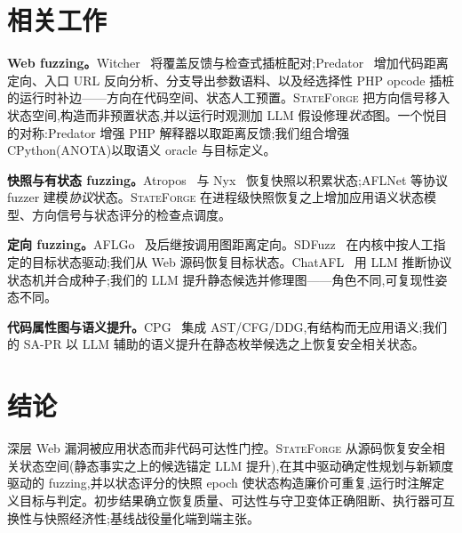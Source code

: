 \documentclass[letterpaper,twocolumn,10pt]{article}
\newcommand{\sys}{\textsc{StateForge}}
\begin{document}
\section{相关工作}
\label{sec:related}
\textbf{Web fuzzing。}Witcher~\cite{witcher} 将覆盖反馈与检查式插桩配对;Predator~\cite{predator} 增加代码距离定向、入口 URL 反向分析、分支导出参数语料、以及经选择性 PHP opcode 插桩的运行时补边——方向在代码空间、状态人工预置。\sys{} 把方向信号移入状态空间,构造而非预置状态,并以运行时观测加 LLM 假设修理\emph{状态}图。一个悦目的对称:Predator 增强 PHP 解释器以取距离反馈;我们组合增强 CPython(ANOTA)以取语义 oracle 与目标定义。

\textbf{快照与有状态 fuzzing。}Atropos~\cite{atropos} 与 Nyx~\cite{nyx} 恢复快照以积累状态;AFLNet 等协议 fuzzer 建模\emph{协议}状态。\sys{} 在进程级快照恢复之上增加应用语义状态模型、方向信号与状态评分的检查点调度。

\textbf{定向 fuzzing。}AFLGo~\cite{aflgo} 及后继按调用图距离定向。SDFuzz~\cite{sdfuzz} 在内核中按人工指定的目标状态驱动;我们从 Web 源码恢复目标状态。ChatAFL~\cite{chatafl} 用 LLM 推断协议状态机并合成种子;我们的 LLM 提升静态候选并修理图——角色不同,可复现性姿态不同。

\textbf{代码属性图与语义提升。}CPG~\cite{yamaguchi} 集成 AST/CFG/DDG,有结构而无应用语义;我们的 SA-PR 以 LLM 辅助的语义提升在静态枚举候选之上恢复安全相关状态。

\section{结论}
深层 Web 漏洞被应用状态而非代码可达性门控。\sys{} 从源码恢复安全相关状态空间(静态事实之上的候选锚定 LLM 提升),在其中驱动确定性规划与新颖度驱动的 fuzzing,并以状态评分的快照 epoch 使状态构造廉价可重复,运行时注解定义目标与判定。初步结果确立恢复质量、可达性与守卫变体正确阻断、执行器可互换性与快照经济性;基线战役量化端到端主张。
\end{document}
